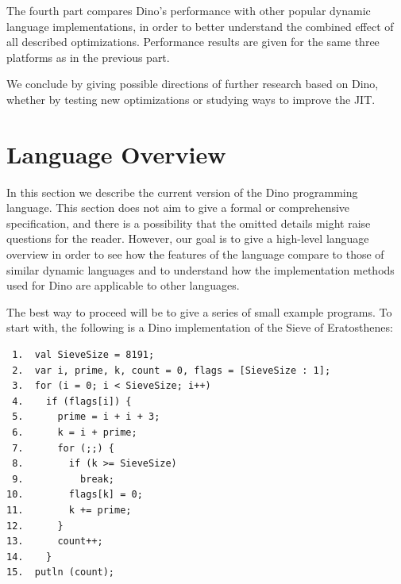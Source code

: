 \documentclass[preprint]{sigplanconf}
\begin{document}
  The fourth part compares Dino's performance with other
popular dynamic language implementations, in order to better understand
the combined effect of all described optimizations. Performance results
are given for the same three platforms as in the previous part.

  We conclude by giving possible directions of further
research based on Dino, whether by testing new optimizations
or studying ways to improve the JIT.

\section{Language Overview}

In this section we describe %
 the current version of the Dino
programming language.
This section does not aim to give a formal or comprehensive specification, and there is a possibility that the omitted details might raise questions for the reader. However, our goal is to give a high-level language overview in order to see how the features of the language compare to those of similar
dynamic languages and to understand how %
the implementation methods used for Dino are applicable to other languages. %


The best way to proceed will be to give a series of small example programs.  To start with, the following is a
Dino implementation of the Sieve of Eratosthenes:

{\footnotesize
\begin{verbatim}
 1.  val SieveSize = 8191;
 2.  var i, prime, k, count = 0, flags = [SieveSize : 1];
 3.  for (i = 0; i < SieveSize; i++)
 4.    if (flags[i]) {
 5.      prime = i + i + 3;
 6.      k = i + prime;
 7.      for (;;) {
 8.        if (k >= SieveSize)
 9.          break;
10.        flags[k] = 0;
11.        k += prime;
12.      }
13.      count++;
14.    }
15.  putln (count);
\end{verbatim}
}
\end{document}
